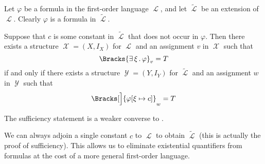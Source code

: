 \begin{proposition}\label{thm:existential_quantifier_removal}
  Let \( \varphi \) be a formula in the first-order language \( \mscrL \), and let \( \widetilde \mscrL \) be an extension of \( \mscrL \). Clearly \( \varphi \) is a formula in \( \widetilde \mscrL \).

  Suppose that \( c \) is some constant in \( \widetilde \mscrL \) that does not occur in \( \varphi \). Then there exists a structure \( \mscrX = (X, I_X) \) for \( \mscrL \) and an assignment \( v \) in \( \mscrX \) such that
  \begin{equation*}
    \Bracks{\qexists \xi \varphi}_v = T
  \end{equation*}
  if and only if there exists a structure \( \mscrY = (Y, I_Y) \) for \( \widetilde \mscrL \) and an assignment \( w \) in \( \mscrY \) such that
  \begin{equation*}
    \Bracks[\Big]{\varphi[\xi \mapsto c]}_w = T
  \end{equation*}
\end{proposition}
\begin{comments}
  \item The sufficiency statement is a weaker converse to .
  \item We can always adjoin a single constant \( c \) to \( \mscrL \) to obtain \( \widetilde \mscrL \) (this is actually the proof of sufficiency). This allows us to eliminate existential quantifiers from formulas at the cost of a more general first-order language.
\end{comments}
